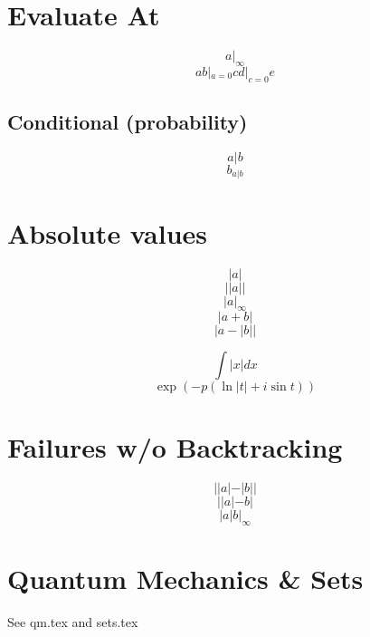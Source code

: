 \documentclass{article}
\begin{document}
%
%
%
%
%
%

\section{Evaluate At}
\[  a |_\infty \]
\[ a b |_{a=0} c d |_{c=0} e \]

\subsection{Conditional (probability)}
\[ a|b \]
\[ b_{a|b} \]

\section{Absolute values}
\[  |a| \]
\[ ||a|| \]
\[  |a |_\infty \]
\[  |a + b| \]
\[  |a - |b|| \]

\[ \int |x| dx \]
\[ \exp (-p(\ln|t|+i\sin t)) \]

\section{Failures w/o Backtracking}
\[  ||a| - |b|| \]
\[ ||a|-b| \]
\[  |a | b |_\infty \]

\section{Quantum Mechanics \& Sets}
See qm.tex and sets.tex
\end{document}
